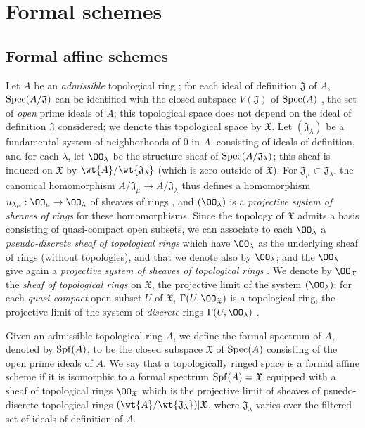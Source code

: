 \section{Formal schemes}
\label{section:1.10}

\subsection{Formal affine schemes}
\label{subsection:1.10.1}

\begin{env}[10.1.1]
\label{1.10.1.1}
Let $A$ be an \emph{admissible} topological ring ; for each ideal of definition $\mathfrak{J}$ of $A$, $\operatorname{Spec}(A/\mathfrak{J})$ can be identified with the closed subspace $V(\mathfrak{J})$ of $\operatorname{Spec}(A)$ , the set of \emph{open} prime ideals of $A$; this topological space does not depend
on the ideal of definition $\mathfrak{J}$ considered; we denote this topological space by $\mathfrak{X}$. Let $(\mathfrak{J}_\lambda)$ be a fundamental system of neighborhoods of $0$ in $A$, consisting of ideals of definition, and for each $\lambda$, let $\OO_\lambda$ be the structure sheaf of $\operatorname{Spec}(A/\mathfrak{J}_\lambda)$; this sheaf is induced on $\mathfrak{X}$ by $\wt{A}/\wt{\mathfrak{J}_\lambda}$ (which is zero outside of $\mathfrak{X}$).
For $\mathfrak{J}_\mu\subset\mathfrak{J}_\lambda$, the canonical homomorphism $A/\mathfrak{J}_\mu\to A/\mathfrak{J}_\lambda$ thus defines a homomorphism $u_{\lambda\mu}:\OO_\mu\to\OO_\lambda$ of sheaves of rings , and $(\OO_\lambda)$ is a \emph{projective system of sheaves of rings} for these homomorphisms.
Since the topology of $\mathfrak{X}$ admits a basis consisting of quasi-compact open subsets, we can associate to each $\OO_\lambda$ a \emph{pseudo-discrete sheaf of topological rings}  which have $\OO_\lambda$ as the underlying sheaf of rings (without topologies), and that we denote also by $\OO_\lambda$; and the $\OO_\lambda$ give again a \emph{projective system of sheaves of topological rings} .
We denote by $\OO_\mathfrak{X}$ the \emph{sheaf of topological rings} on $\mathfrak{X}$, the projective limit of the system $(\OO_\lambda)$; for each \emph{quasi-compact} open subset $U$ of $\mathfrak{X}$, $\Gamma(U,\OO_\mathfrak{X})$ is a topological ring, the projective limit of the system of \emph{discrete} rings $\Gamma(U,\OO_\lambda)$ .
\end{env}

\begin{defn}[10.1.2]
\label{1.10.1.2}
Given an admissible topological ring $A$, we define the formal spectrum of $A$, denoted by $\operatorname{Spf}(A)$, to be the closed subspace $\mathfrak{X}$ of $\operatorname{Spec}(A)$ consisting of the open prime ideals of $A$.
We say that a topologically ringed space is a formal affine scheme if it is isomorphic to a formal spectrum $\operatorname{Spf}(A)=\mathfrak{X}$ equipped with a sheaf of topological rings $\OO_\mathfrak{X}$ which is the projective limit of sheaves of psuedo-discrete topological rings $(\wt{A}/\wt{\mathfrak{J}_\lambda})|\mathfrak{X}$, where $\mathfrak{J}_\lambda$ varies over the filtered set of ideals of definition of $A$.
\end{defn}


